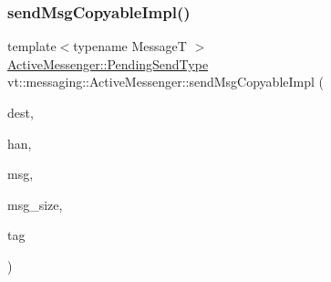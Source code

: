 \subsubsection{\texorpdfstring{send\+Msg\+Copyable\+Impl()}{sendMsgCopyableImpl()}}
{\footnotesize\ttfamily template$<$typename MessageT $>$ \\
\hyperlink{structvt_1_1messaging_1_1_active_messenger_a3626a6ca76d8ad4ec7c3b47a2c70d3a8}{Active\+Messenger\+::\+Pending\+Send\+Type} vt\+::messaging\+::\+Active\+Messenger\+::send\+Msg\+Copyable\+Impl (\begin{DoxyParamCaption}\item[{\hyperlink{namespacevt_a866da9d0efc19c0a1ce79e9e492f47e2}{Node\+Type}}]{dest,  }\item[{\hyperlink{namespacevt_af64846b57dfcaf104da3ef6967917573}{Handler\+Type}}]{han,  }\item[{\hyperlink{structvt_1_1messaging_1_1_msg_shared_ptr}{Msg\+Shared\+Ptr}$<$ MessageT $>$ \&}]{msg,  }\item[{\hyperlink{namespacevt_aab8d55968084610ce3b17057981e9300}{Byte\+Type}}]{msg\+\_\+size,  }\item[{\hyperlink{namespacevt_a84ab281dae04a52a4b243d6bf62d0e52}{Tag\+Type}}]{tag }\end{DoxyParamCaption})}

\mbox{\label{structvt_1_1messaging_1_1_active_messenger_a7f2e8867a9d967eb7f43df7d5c420775}} 
